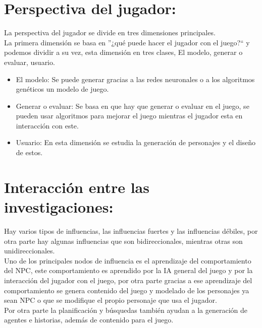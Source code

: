 \section*{Perspectiva del jugador:}

La perspectiva del jugador se divide en tres dimensiones principales.\\
	
La primera dimensión se basa en ''¿qué puede hacer el jugador con el juego?`` y podemos dividir a su vez, esta dimensión en tres clases, El modelo, generar o evaluar, usuario.

\begin{itemize}

	\item El modelo: Se puede generar gracias a las redes neuronales o a los algoritmos 	genéticos un modelo de juego.\\
		
	\item Generar o evaluar: Se basa en que hay que generar o evaluar en el juego, se pueden 	usar algoritmos para mejorar el juego mientras el jugador esta en interacción con este.\\

	\item Usuario: En esta dimensión se estudia la generación de personajes y el diseño de 	estos.\\  
	
\end{itemize}

\section{Interacción entre las investigaciones:}

Hay varios tipos de influencias, las influencias fuertes y las influencias débiles, por otra parte hay algunas influencias que son bidireccionales, mientras otras son unidireccionales.\\

Uno de los principales nodos de influencia es el aprendizaje del comportamiento del NPC, este comportamiento es aprendido por la IA general del juego y por la interacción del jugador con el juego, por otra parte gracias a ese aprendizaje del comportamiento se genera contenido del juego y modelado de los personajes ya sean NPC o que se modifique el propio personaje que usa el jugador.\\

Por otra parte la planificación y búsquedas también ayudan a la generación de agentes e historias, además de contenido para el juego.\\

